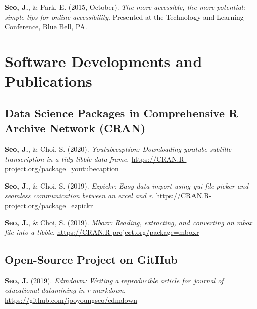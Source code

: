 \documentclass[11pt, a4paper]{awesome-cv}
\begin{document}
\textbf{Seo, J.}, \& Park, E. (2015, October). \emph{The more accessible, the more potential: simple tips for online accessibility}. Presented at the Technology and Learning Conference, Blue Bell, PA.

\endgroup

\hypertarget{software-developments-and-publications}{%
\section{Software Developments and Publications}\label{software-developments-and-publications}}

\hypertarget{data-science-packages-in-comprehensive-r-archive-network-cran}{%
\subsection{Data Science Packages in Comprehensive R Archive Network (CRAN)}\label{data-science-packages-in-comprehensive-r-archive-network-cran}}

\begingroup
\setlength{\parindent}{-0.5in}
\setlength{\leftskip}{0.5in}

\hypertarget{refs_R_packages}{}
\leavevmode\hypertarget{ref-R-youtubecaption}{}%
\textbf{Seo, J.}, \& Choi, S. (2020). \emph{Youtubecaption: Downloading youtube subtitle transcription in a tidy tibble data frame}. \url{https://CRAN.R-project.org/package=youtubecaption}

\leavevmode\hypertarget{ref-R-ezpickr}{}%
\textbf{Seo, J.}, \& Choi, S. (2019). \emph{Ezpickr: Easy data import using gui file picker and seamless communication between an excel and r}. \url{https://CRAN.R-project.org/package=ezpickr}

\leavevmode\hypertarget{ref-R-mboxr}{}%
\textbf{Seo, J.}, \& Choi, S. (2019). \emph{Mboxr: Reading, extracting, and converting an mbox file into a tibble}. \url{https://CRAN.R-project.org/package=mboxr}

\endgroup

\hypertarget{open-source-project-on-github}{%
\subsection{Open-Source Project on GitHub}\label{open-source-project-on-github}}

\begingroup
\setlength{\parindent}{-0.5in}
\setlength{\leftskip}{0.5in}

\hypertarget{refs_github_projects}{}
\leavevmode\hypertarget{ref-R-edmdown}{}%
\textbf{Seo, J.} (2019). \emph{Edmdown: Writing a reproducible article for journal of educational datamining in r markdown}. \url{https://github.com/jooyoungseo/edmdown}
\end{document}
